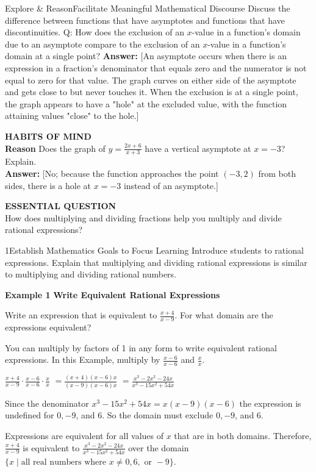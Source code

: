 \documentclass{article}
\newenvironment{concept-box}{}{}
\newenvironment{example}[1]{\textbf{Example #1}}{}
\newenvironment{te-addendum}[2]{\textbf{TE (#1 - #2)}}{}
\newcommand{\answer}[1]{\textbf{Answer:} #1}
\begin{document}
\begin{te-addendum}{Explore \& Reason}{Facilitate Meaningful Mathematical Discourse}
Discuss the difference between functions that have asymptotes and functions that have discontinuities.
Q: How does the exclusion of an $x$-value in a function's domain due to an asymptote compare to the exclusion of an $x$-value in a function's domain at a single point?
\answer{[An asymptote occurs when there is an expression in a fraction's denominator that equals zero and the numerator is not equal to zero for that value. The graph curves on either side of the asymptote and gets close to but never touches it. When the exclusion is at a single point, the graph appears to have a "hole" at the excluded value, with the function attaining values "close" to the hole.]}
\end{te-addendum}

\begin{concept-box}
\textbf{HABITS OF MIND} \\
\textbf{Reason} Does the graph of $y = \frac{2x+6}{x+3}$ have a vertical asymptote at $x = -3$? Explain. \\
\answer{[No; because the function approaches the point $(-3, 2)$ from both sides, there is a hole at $x = -3$ instead of an asymptote.]}
\end{concept-box}

\begin{concept-box}
\textbf{ESSENTIAL QUESTION} \\
How does multiplying and dividing fractions help you multiply and divide rational expressions?
\end{concept-box}

\begin{te-addendum}{1}{Establish Mathematics Goals to Focus Learning}
Introduce students to rational expressions. Explain that multiplying and dividing rational expressions is similar to multiplying and dividing rational numbers.
\end{te-addendum}

\begin{example}{1}
\textbf{Write Equivalent Rational Expressions}

Write an expression that is equivalent to $\frac{x+4}{x-9}$. For what domain are the expressions equivalent?

You can multiply by factors of 1 in any form to write equivalent rational expressions. In this Example, multiply by $\frac{x-6}{x-6}$ and $\frac{x}{x}$.

$\frac{x+4}{x-9} \cdot \frac{x-6}{x-6} \cdot \frac{x}{x}$
$= \frac{(x+4)(x-6)x}{(x-9)(x-6)x}$
$= \frac{x^3 - 2x^2 - 24x}{x^3 - 15x^2 + 54x}$

Since the denominator $x^3 - 15x^2 + 54x = x(x-9)(x-6)$ the expression is undefined for $0, -9$, and $6$. So the domain must exclude $0, -9$, and $6$.

Expressions are equivalent for all values of $x$ that are in both domains. Therefore, $\frac{x+4}{x-9}$ is equivalent to $\frac{x^3 - 2x^2 - 24x}{x^3 - 15x^2 + 54x}$ over the domain $\{x \mid \text{all real numbers where } x \neq 0, 6, \text{ or } -9\}$.
\end{example}
\end{document}
